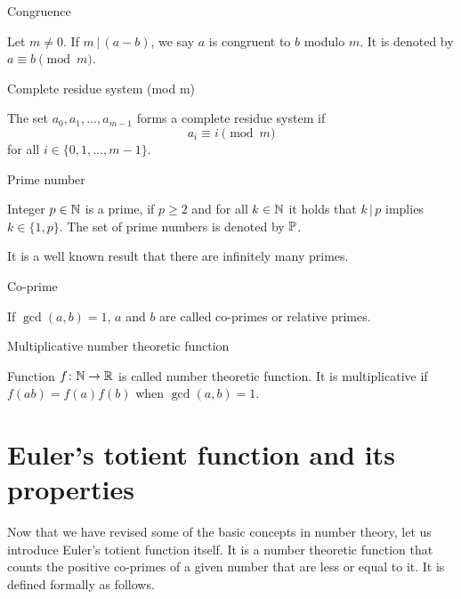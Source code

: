 \documentclass{article}
\begin{document}
\begin{definition}
Congruence

Let $m\not=0$. If $m\,\vert\,(a-b)$, we say $a$ is congruent to $b$ modulo $m$. It is denoted by $a\equiv b \pmod{m}$.
\end{definition}

\begin{definition}
Complete residue system (mod m)

The set $a_0,a_1,\dots,a_{m-1}$ forms a complete residue system if
\begin{equation*}
    a_i \equiv i \pmod{m}
\end{equation*}
for all $i\in\{0,1,\dots,m-1\}$.
\end{definition}

\begin{definition}
Prime number

Integer $p\in\mathbb{N}$ is a prime, if $p \geq 2$ and for all $k\in\mathbb{N}$ it holds that $k \,\vert\, p$ implies $k\in\{1, p\}$. The set of prime numbers is denoted by $\mathbb{P}$.

It is a well known result that there are infinitely many primes.


\end{definition}

\begin{definition}
Co-prime

If $\gcd(a,b) = 1$, $a$ and $b$ are called co-primes or relative primes.
\end{definition}

\begin{definition}
Multiplicative number theoretic function

Function $f\colon \mathbb{N} \rightarrow \mathbb{R}$ is called number theoretic function. It is multiplicative if $f(ab) = f(a)f(b)$ when $\gcd(a, b)=1$.

\end{definition}

\section{Euler's totient function and its properties}

Now that we have revised some of the basic concepts in number theory, let us introduce Euler's totient function itself. It is a number theoretic function that counts the positive co-primes of a given number that are less or equal to it. It is defined formally as follows.
\end{document}

